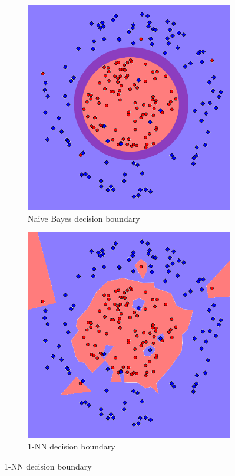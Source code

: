 \documentclass[letterpaper,10pt]{article} %
\begin{document}
\begin{figure}[h]
\begin{subfigure}[b]{\textwidth}
\includegraphics[width=\textwidth]{handout/q3-2-bayes}
\caption{Naive Bayes decision boundary}
\label{fig:bayes2}
\end{subfigure}

\begin{subfigure}[b]{\textwidth}
\includegraphics[width=\textwidth]{handout/q3-2-NN}
\caption{1-NN decision boundary}
\label{fig:1nn2}
\end{subfigure}


\end{figure}
\end{document}
